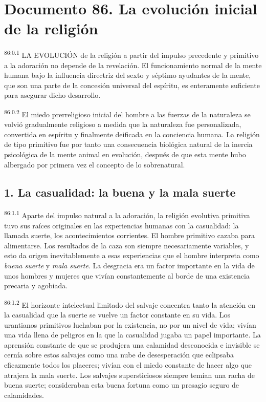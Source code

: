 \chapter{Documento 86. La evolución inicial de la religión}
\par
\textsuperscript{86:0.1} LA EVOLUCIÓN de la religión a partir del impulso precedente y primitivo a la adoración no depende de la revelación. El funcionamiento normal de la mente humana bajo la influencia directriz del sexto y séptimo ayudantes de la mente, que son una parte de la concesión universal del espíritu, es enteramente suficiente para asegurar dicho desarrollo.

\par
\textsuperscript{86:0.2} El miedo prerreligioso inicial del hombre a las fuerzas de la naturaleza se volvió gradualmente religioso a medida que la naturaleza fue personalizada, convertida en espíritu y finalmente deificada en la conciencia humana. La religión de tipo primitivo fue por tanto una consecuencia biológica natural de la inercia psicológica de la mente animal en evolución, después de que esta mente hubo albergado por primera vez el concepto de lo sobrenatural.

\section*{1. La casualidad: la buena y la mala suerte}
\par
\textsuperscript{86:1.1} Aparte del impulso natural a la adoración, la religión evolutiva primitiva tuvo sus raíces originales en las experiencias humanas con la casualidad: la llamada suerte, los acontecimientos corrientes. El hombre primitivo cazaba para alimentarse. Los resultados de la caza son siempre necesariamente variables, y esto da origen inevitablemente a esas experiencias que el hombre interpreta como \textit{buena suerte} y \textit{mala suerte}. La desgracia era un factor importante en la vida de unos hombres y mujeres que vivían constantemente al borde de una existencia precaria y agobiada.

\par
\textsuperscript{86:1.2} El horizonte intelectual limitado del salvaje concentra tanto la atención en la casualidad que la suerte se vuelve un factor constante en su vida. Los urantianos primitivos luchaban por la existencia, no por un nivel de vida; vivían una vida llena de peligros en la que la casualidad jugaba un papel importante. La aprensión constante de que se produjera una calamidad desconocida e invisible se cernía sobre estos salvajes como una nube de desesperación que eclipsaba eficazmente todos los placeres; vivían con el miedo constante de hacer algo que atrajera la mala suerte. Los salvajes supersticiosos siempre temían una racha de buena suerte; consideraban esta buena fortuna como un presagio seguro de calamidades.

